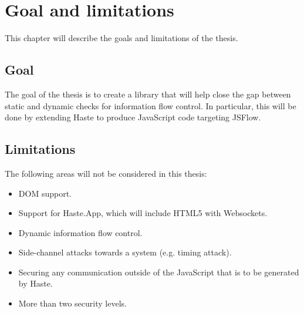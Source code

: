 \chapter{Goal and limitations}
This chapter will describe the goals and limitations of the thesis.

\section{Goal}
The goal of the thesis is to create a library that will help close the gap between static and dynamic checks for information flow control. In particular, this will be done by extending Haste to produce JavaScript code targeting JSFlow.

\section{Limitations}
The following areas will not be considered in this thesis:
\begin{itemize}
  \item DOM support.
  \item Support for Haste.App, which will include HTML5 with Websockets.
  \item Dynamic information flow control.
  \item Side-channel attacks towards a system (e.g. timing attack).
  \item Securing any communication outside of the JavaScript that is to be generated by Haste.
  \item More than two security levels.
\end{itemize}
